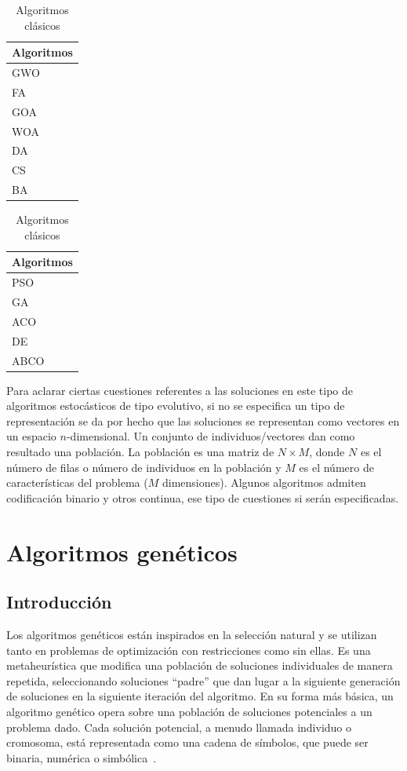 \begin{table}[H]
    \parbox{.45\linewidth}{
        \centering
        \begin{tabular}{l}
            \hline
            Algoritmos \\ \hline
            GWO        \\
            FA         \\
            GOA        \\
            WOA        \\
            DA         \\
            CS         \\
            BA         \\
            \hline
        \end{tabular}
        \caption{Algoritmos modernos}
    }
    \hfill
    \parbox{.45\linewidth}{
        \centering
        \begin{tabular}{l}
            \hline
            Algoritmos \\ \hline
            PSO        \\
            GA         \\
            ACO        \\
            DE         \\
            ABCO       \\
            \hline
        \end{tabular}
        \caption{Algoritmos clásicos}
    }
\end{table}
Para aclarar ciertas cuestiones referentes a las soluciones en este tipo de algoritmos estocásticos de tipo evolutivo, si no se especifica un tipo de representación se da por hecho que las soluciones se representan como vectores en un espacio $n$-dimensional. Un conjunto de individuos/vectores dan como resultado una población. La población es una matriz de $N\times M$, donde $N$ es el número de filas o número de individuos en la población y $M$ es el número de características del problema ($M$ dimensiones). Algunos algoritmos admiten codificación binario y otros continua, ese tipo de cuestiones si serán especificadas.
\section{Algoritmos genéticos}
\subsection{Introducción}
Los algoritmos genéticos están inspirados en la selección natural y se utilizan tanto en problemas de optimización con restricciones como sin ellas. Es una metaheurística que modifica una población de soluciones individuales de manera repetida, seleccionando soluciones ``padre'' que dan lugar a la siguiente generación de soluciones en la siguiente iteración del algoritmo. En su forma más básica, un algoritmo genético opera sobre una población de soluciones potenciales a un problema dado. Cada solución potencial, a menudo llamada individuo o cromosoma, está representada como una cadena de símbolos, que puede ser binaria, numérica o simbólica~\cite{10.5555/522098}.

